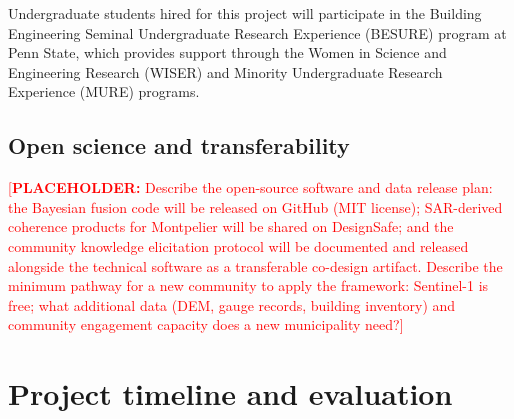 \documentclass[11pt]{article}
\newcommand{\placeholder}[1]{\textcolor{red}{[\textbf{PLACEHOLDER:} #1]}}
\begin{document}
Undergraduate students hired for this project will participate in the Building
Engineering Seminal Undergraduate Research Experience (BESURE) program at Penn
State, which provides support through the Women in Science and Engineering Research
(WISER) and Minority Undergraduate Research Experience (MURE) programs.

\vspace{-10pt}
\subsection{Open science and transferability}
\placeholder{Describe the open-source software and data release plan: the Bayesian fusion code will be released on GitHub (MIT license); SAR-derived coherence products for Montpelier will be shared on DesignSafe; and the community knowledge elicitation protocol will be documented and released alongside the technical software as a transferable co-design artifact. Describe the minimum pathway for a new community to apply the framework: Sentinel-1 is free; what additional data (DEM, gauge records, building inventory) and community engagement capacity does a new municipality need?}


\section{Project timeline and evaluation}
\end{document}
